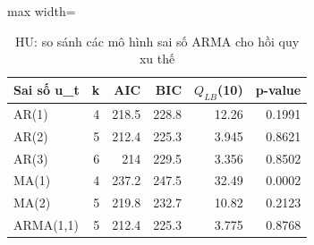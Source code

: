\begin{table}[H]
\centering\small
\caption{HU: so sánh các mô hình sai số ARMA cho hồi quy xu thế}\label{tab:tab_b11_13_hu_models}
\begin{adjustbox}{max width=\linewidth}
\begin{tabular}{lrrrrr}
\toprule
Sai số u\_t & k & AIC & BIC & $Q_{LB}$(10) & p-value \\
\midrule
AR(1) & 4 & 218.5 & 228.8 & 12.26 & 0.1991 \\
AR(2) & 5 & 212.4 & 225.3 & 3.945 & 0.8621 \\
AR(3) & 6 & 214 & 229.5 & 3.356 & 0.8502 \\
MA(1) & 4 & 237.2 & 247.5 & 32.49 & 0.0002 \\
MA(2) & 5 & 219.8 & 232.7 & 10.82 & 0.2123 \\
ARMA(1,1) & 5 & 212.4 & 225.3 & 3.775 & 0.8768 \\
\bottomrule
\end{tabular}
\end{adjustbox}\par{}
\end{table}
